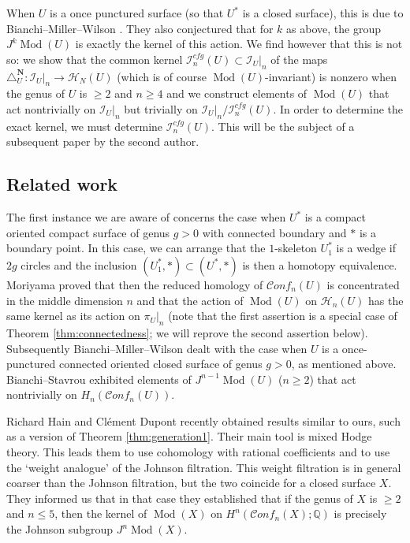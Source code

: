 \documentclass[12pt,letterpaper]{amsart}
\numberwithin{equation}{section}
\def\Nbold{{\mathbf N}}
\def\QQ{{\mathbb Q}}
\def\Hcal{{\mathcal H}}
\def\Ical{{\mathcal I}}
\newcommand\conf{\mathscr{C}\!\mathit{onf}\!}
\newcommand\cfg{\mathit{cfg}}
\newcommand\Mod{\operatorname{Mod}}
\theoremstyle{remark}
\begin{document}
When $U$ is a once punctured surface (so that $U^*$ is a closed surface), this is due to Bianchi--Miller--Wilson \cite{bmw}. They also conjectured that for $k$ as above, the group $J^k\Mod(U)$ is exactly the kernel of this action. We  find however that
this is not so: we show that the common kernel $\Ical^\cfg_n(U)\subset\Ical_U|_n$ of the  maps 
$\triangle_U^\Nbold: \Ical_{U}|_n\to  \Hcal_N(U)$ (which is of course $\Mod(U)$-invariant) is nonzero when the genus of $U$ is $\ge 2$ and $n\ge 4$
and we  construct elements of $\Mod(U)$ that act nontrivially on $\Ical_U|_n$ but trivially on $\Ical_U|_n/\Ical^\cfg_n(U)$.
In order to determine the exact kernel, we must determine  $\Ical^\cfg_n(U)$. This will be the subject of a subsequent paper by the second author.


\subsection*{Related work} The first instance  we are aware of concerns the case when $U^*$ is  a compact oriented compact  
 surface of genus $g>0$ with connected  boundary  and $*$ is a boundary point. In this case, we can arrange that the $1$-skeleton $U_1^*$ is a wedge if $2g$ circles and the inclusion $(U_1^*,*)\subset (U^*,*)$  is then a homotopy equivalence. Moriyama \cite{moriyama}  proved that then the  reduced homology of  $\conf_n(U)$  is concentrated in the middle dimension $n$ and that the action of 
 $\Mod(U)$ on  $\Hcal_n(U)$ has the same kernel as its action on $\pi_U|_n$ (note that the first assertion is a special case of Theorem \ref{thm:connectedness};  we will reprove the second assertion below). Subsequently Bianchi--Miller--Wilson \cite{bmw} dealt with the case when 
 $U$ is a once-punctured connected  oriented closed surface of genus $g>0$,  as mentioned above.
 Bianchi--Stavrou \cite{bs} exhibited elements of  $J^{n-1}\Mod(U)$ ($n\ge 2$) that  act nontrivially on $H_n(\conf_n(U))$. 
 
Richard Hain and Cl\'ement Dupont recently obtained results similar to ours, such as a version of Theorem \ref{thm:generation1}. Their  main tool is  mixed Hodge theory. This  leads   them to use cohomology  with rational coefficients and to use the `weight analogue' of the  Johnson filtration. This weight  filtration is in general coarser than the Johnson filtration, but  the two coincide  for a closed  surface $X$.  They informed us  that in that case  they established that if  the genus of $X$ is $\ge 2$ and $n\le 5$,  then the  kernel of $\Mod(X)$ on $H^n(\conf_n(X); \QQ)$ is precisely the Johnson subgroup $J^n\Mod(X)$.
\smallskip
 
\end{document}
